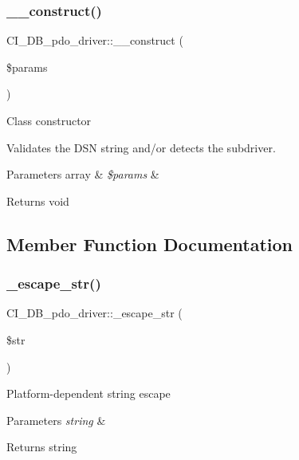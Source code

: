 \subsubsection{\texorpdfstring{\+\_\+\+\_\+construct()}{\_\_construct()}}
{\footnotesize\ttfamily C\+I\+\_\+\+D\+B\+\_\+pdo\+\_\+driver\+::\+\_\+\+\_\+construct (\begin{DoxyParamCaption}\item[{}]{\$params }\end{DoxyParamCaption})}

Class constructor

Validates the D\+SN string and/or detects the subdriver.


\begin{DoxyParams}[1]{Parameters}
array & {\em \$params} & \\
\hline
\end{DoxyParams}
\begin{DoxyReturn}{Returns}
void 
\end{DoxyReturn}


\subsection{Member Function Documentation}
\mbox{\label{class_c_i___d_b__pdo__driver_a03c9fec23f9fe84aec033fcd4678b4e0}} 
\subsubsection{\texorpdfstring{\+\_\+escape\+\_\+str()}{\_escape\_str()}}
{\footnotesize\ttfamily C\+I\+\_\+\+D\+B\+\_\+pdo\+\_\+driver\+::\+\_\+escape\+\_\+str (\begin{DoxyParamCaption}\item[{}]{\$str }\end{DoxyParamCaption})\hspace{0.3cm}{\ttfamily [protected]}}

Platform-\/dependent string escape


\begin{DoxyParams}{Parameters}
{\em string} & \\
\hline
\end{DoxyParams}
\begin{DoxyReturn}{Returns}
string 
\end{DoxyReturn}
\mbox{\label{class_c_i___d_b__pdo__driver_a583c8f7e4a6242607a207c59ff8e84dc}} 
